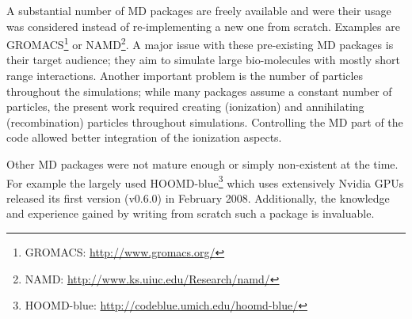 A substantial number of MD packages are freely available and were
their usage was considered instead of re-implementing a new one from scratch.
Examples are GROMACS\footnote{GROMACS:
\url{http://www.gromacs.org/}} or NAMD\footnote{NAMD:
\url{http://www.ks.uiuc.edu/Research/namd/}}. A major issue with these
pre-existing MD packages is their target audience; they aim to simulate large
bio-molecules with mostly short range interactions. Another important problem
is the number of particles throughout the simulations; while many packages
assume a constant number of particles, the present work required creating
(ionization) and annihilating (recombination) particles throughout simulations.
Controlling the MD part of the code allowed better integration of the
ionization aspects.

Other MD packages were not mature enough or simply non-existent at the time.
For example the largely used HOOMD-blue\footnote{HOOMD-blue:
\url{http://codeblue.umich.edu/hoomd-blue/}} which uses extensively
Nvidia GPUs released its first version (v0.6.0) in February 2008.
Additionally, the knowledge and experience gained by writing from scratch such
a package is invaluable.
